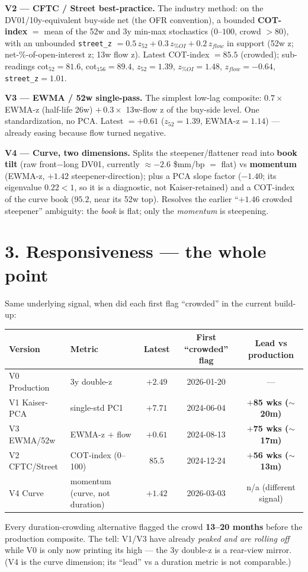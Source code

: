 \documentclass[10pt,a4paper]{article}
\newcommand{\sect}[1]{\section*{\color{bigorange}#1}}
\newcommand{\code}[1]{\texttt{\small #1}}
\begin{document}
\textbf{V2 --- CFTC / Street best-practice.} The industry method: on the DV01/10y-equivalent buy-side net
(the OFR convention), a bounded \textbf{COT-index} $=$ mean of the 52w and 3y min-max stochastics
($0$--$100$, crowd $>$80), with an unbounded \code{street\_z} $=0.5\,z_{52}+0.3\,z_{\%OI}+0.2\,z_{flow}$
in support (52w z; net-\%-of-open-interest z; 13w flow z). Latest COT-index $=\mathbf{85.5}$ (crowded);
sub-readings cot$_{52}=81.6$, cot$_{156}=89.4$, $z_{52}=1.39$, $z_{\%OI}=1.48$, $z_{flow}=-0.64$,
\code{street\_z}$=1.01$.

\textbf{V3 --- EWMA / 52w single-pass.} The simplest low-lag composite: $0.7\times$ EWMA-z (half-life
26w) $+\,0.3\times$ 13w-flow z of the buy-side level. One standardization, no PCA. Latest $=+0.61$
($z_{52}=1.39$, EWMA-z$=1.14$) --- already easing because flow turned negative.

\textbf{V4 --- Curve, two dimensions.} Splits the steepener/flattener read into \textbf{book tilt} (raw
front$-$long DV01, currently $\approx-2.6$ \$mm/bp $=$ flat) vs \textbf{momentum} (EWMA-z, $+1.42$
steepener-direction); plus a PCA slope factor ($-1.40$; its eigenvalue $0.22<1$, so it is a diagnostic,
not Kaiser-retained) and a COT-index of the curve book ($95.2$, near its 52w top). Resolves the earlier
``$+1.46$ crowded steepener'' ambiguity: the \emph{book} is flat; only the \emph{momentum} is steepening.

\sect{3. Responsiveness --- the whole point}
Same underlying signal, when did each first flag ``crowded'' in the current build-up:
\begin{center}\begin{tabular}{llccc}
\toprule
Version & Metric & Latest & First ``crowded'' flag & Lead vs production\\
\midrule
V0 Production & 3y double-z & $+2.49$ & 2026-01-20 & ---\\
V1 Kaiser-PCA & single-std PC1 & $+7.71$ & 2024-06-04 & \textbf{$+$85 wks ($\sim$20m)}\\
V3 EWMA/52w & EWMA-z $+$ flow & $+0.61$ & 2024-08-13 & \textbf{$+$75 wks ($\sim$17m)}\\
V2 CFTC/Street & COT-index (0--100) & $85.5$ & 2024-12-24 & \textbf{$+$56 wks ($\sim$13m)}\\
V4 Curve & momentum (curve, not duration) & $+1.42$ & 2026-03-03 & n/a (different signal)\\
\bottomrule
\end{tabular}\end{center}
Every duration-crowding alternative flagged the crowd \textbf{13--20 months} before the production
composite. The tell: V1/V3 have already \emph{peaked and are rolling off} while V0 is only now printing
its high --- the 3y double-z is a rear-view mirror. (V4 is the curve dimension; its ``lead'' vs a
duration metric is not comparable.)
\end{document}
